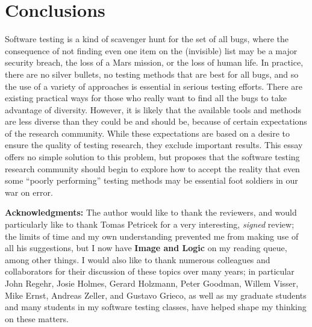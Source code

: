 \documentclass[sigplan,screen]{acmart}
\begin{document}
\section{Conclusions}

Software testing is a kind of scavenger hunt for the set of all bugs,
where the consequence of not finding even one item on the (invisible)
list may be a major security breach, the loss of a Mars mission, or
the loss of human life.  In practice, there are no silver bullets, no
testing methods that are best for all bugs, and so the use of a
variety of approaches is essential in serious testing efforts.  There
are existing practical ways for those who really want to find all the
bugs to take advantage of diversity.  However, it is likely that the
available tools and methods are less diverse than they could be and
should be, because of certain expectations of the research community.
While these expectations are based on a desire to ensure the quality
of testing research, they exclude important results.   This essay
offers no simple solution to this problem, but proposes that the
software testing research community should begin to explore how to
accept the reality that even some ``poorly performing'' testing methods may
be essential foot soldiers in our war on error.

{\bf Acknowledgments:} The author would like to thank the 
reviewers, and would particularly like to thank Tomas Petricek for a
very interesting, \emph{signed} review; the limits of time and my own
understanding prevented me from making use of all his suggestions, but
I now have {\bf Image and Logic} on my reading queue, among other
things.  I would also like to thank numerous colleagues and
collaborators for their discussion of these topics over many years; in
particular John Regehr, Josie Holmes, Gerard Holzmann, Peter Goodman,
Willem Visser, Mike Ernst, Andreas Zeller, and
Gustavo Grieco, as well as my graduate students and many students in my
software testing classes, have helped shape my thinking on these matters.

\balance




\balance
\end{document}
